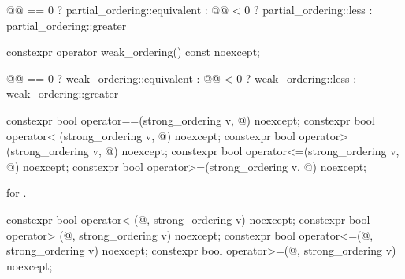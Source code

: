 \begin{itemdescr}
\pnum
\returns
\begin{codeblock}
@@ == 0 ? partial_ordering::equivalent :
@@ < 0  ? partial_ordering::less :
             partial_ordering::greater
\end{codeblock}
\end{itemdescr}

%
\begin{itemdecl}
constexpr operator weak_ordering() const noexcept;
\end{itemdecl}

\begin{itemdescr}
\pnum
\returns
\begin{codeblock}
@@ == 0 ? weak_ordering::equivalent :
@@ < 0  ? weak_ordering::less :
             weak_ordering::greater
\end{codeblock}
\end{itemdescr}

%
%
%
%
%
\begin{itemdecl}
constexpr bool operator==(strong_ordering v, @\unspec@) noexcept;
constexpr bool operator< (strong_ordering v, @\unspec@) noexcept;
constexpr bool operator> (strong_ordering v, @\unspec@) noexcept;
constexpr bool operator<=(strong_ordering v, @\unspec@) noexcept;
constexpr bool operator>=(strong_ordering v, @\unspec@) noexcept;
\end{itemdecl}

\begin{itemdescr}
\pnum
\returns
{} for .
\end{itemdescr}

%
%
%
%
\begin{itemdecl}
constexpr bool operator< (@\unspec@, strong_ordering v) noexcept;
constexpr bool operator> (@\unspec@, strong_ordering v) noexcept;
constexpr bool operator<=(@\unspec@, strong_ordering v) noexcept;
constexpr bool operator>=(@\unspec@, strong_ordering v) noexcept;
\end{itemdecl}

